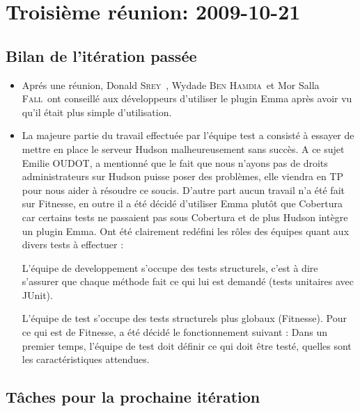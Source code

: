 \documentclass[a4paper,12pt]{article}
\def\familyname{\textsc}
\def\firstname#1{#1}
\def\groupmember#1#2{\firstname{#1} \familyname{#2}}
\def\mwyd{\groupmember{Wydade}{Ben Hamdia}}
\def\mmor{\groupmember{Mor Salla}{Fall}}
\def\mdon{\groupmember{Donald}{Srey}}
\begin{document}
\section{Troisième réunion: 2009-10-21}

\subsection{Bilan de l'itération passée}

\begin{itemize}

\item Aprés une réunion, \mdon\ , \mwyd\ et \mmor\ ont conseillé aux développeurs d'utiliser le plugin Emma après avoir vu qu'il était plus simple d'utilisation.

 \item La majeure partie du travail effectuée par l'équipe test a consisté à essayer de mettre
en place le serveur Hudson malheureusement sans succès. A ce sujet Emilie OUDOT, a
mentionné que le fait que nous n'ayons pas de droits administrateurs sur Hudson puisse
poser des problèmes, elle viendra en TP pour nous aider à résoudre ce soucis.
D'autre part aucun travail n'a été fait sur Fitnesse, en outre il a été décidé d'utiliser
Emma plutôt que Cobertura car certains tests ne passaient pas sous Cobertura et de plus
Hudson intègre un plugin Emma.
Ont été clairement redéfini les rôles des équipes quant aux divers tests à effectuer :

L'équipe de developpement s'occupe des tests structurels, c'est à dire s'assurer que
chaque méthode fait ce qui lui est demandé (tests unitaires avec JUnit).

L'équipe de test s'occupe des tests structurels plus globaux (Fitnesse).
Pour ce qui est de Fitnesse, a été décidé le fonctionnement suivant :
Dans un premier temps, l'équipe de test doit définir ce qui doit être testé, quelles sont les
caractéristiques attendues.

\end{itemize}


\subsection{Tâches pour la prochaine itération}
\end{document}
